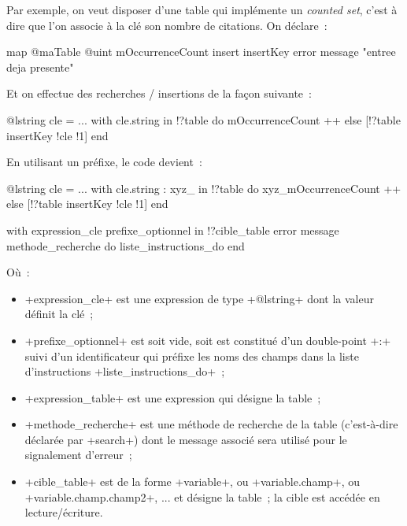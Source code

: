 Par exemple, on veut disposer d'une table qui implémente un \emph{counted set}, c'est à dire que l'on associe à la clé son nombre de citations. On déclare~:
\begin{galgas3}
map @maTable {
  @uint mOccurrenceCount
  insert insertKey error message "entree deja presente"
}
\end{galgas3}

Et on effectue des recherches / insertions de la façon suivante~:
\begin{galgas3}
@lstring cle = ...
with cle.string in !?table do
  mOccurrenceCount ++
else
  [!?table insertKey !cle !1]
end
\end{galgas3}

En utilisant un préfixe, le code devient~:
\begin{galgas3}
@lstring cle = ...
with cle.string : xyz_ in !?table do
  xyz_mOccurrenceCount ++
else
  [!?table insertKey !cle !1]
end
\end{galgas3}





\begin{galgas3}
with expression_cle prefixe_optionnel in !?cible_table
error message methode_recherche
do
  liste_instructions_do
end
\end{galgas3}

Où~:
\begin{itemize}
  \item \ggst+expression_cle+ est une expression de type \ggst+@lstring+ dont la valeur définit la clé~;
  \item \ggst+prefixe_optionnel+ est soit vide, soit est constitué d'un double-point \ggst+:+ suivi d'un identificateur qui préfixe les noms des champs dans la liste d'instructions \ggst+liste_instructions_do+~;
  \item \ggst+expression_table+ est une expression qui désigne la table~;
  \item \ggst+methode_recherche+ est une méthode de recherche de la table (c'est-à-dire déclarée par \ggst+search+) dont le message associé sera utilisé pour le signalement d'erreur~;
  \item \ggst+cible_table+ est de la forme \ggst+variable+, ou  \ggst+variable.champ+, ou \ggst+variable.champ.champ2+, ... et désigne la table~; la cible est accédée en lecture/écriture.
\end{itemize}

